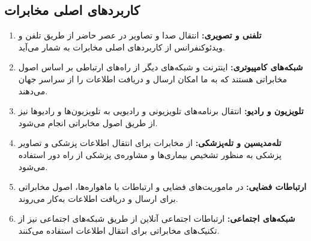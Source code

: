 \subsection{کاربردهای اصلی مخابرات}
\begin{enumerate}
	\item \textbf{تلفنی و تصویری:} انتقال صدا و تصاویر در عصر حاضر از طریق تلفن و ویدئوکنفرانس از کاربردهای اصلی مخابرات به شمار می‌آید.
	
	\item \textbf{شبکه‌های کامپیوتری:} اینترنت و شبکه‌های دیگر از راه‌های ارتباطی بر اساس اصول مخابراتی هستند که به ما امکان ارسال و دریافت اطلاعات را از سراسر جهان می‌دهند.
	
	\item \textbf{تلویزیون و رادیو:} انتقال برنامه‌های تلویزیونی و رادیویی به تلویزیون‌ها و رادیوها نیز از طریق اصول مخابراتی انجام می‌شود.
	
	\item \textbf{تله‌مدیسین و تله‌پزشکی:} از مخابرات برای انتقال اطلاعات پزشکی و تصاویر پزشکی به منظور تشخیص بیماری‌ها و مشاوره‌ی پزشکی از راه دور استفاده می‌شود.
	
	\item \textbf{ارتباطات فضایی:} در ماموریت‌های فضایی و ارتباطات با ماهواره‌ها، اصول مخابراتی برای ارسال و دریافت اطلاعات به‌کار می‌روند.
	
	\item \textbf{شبکه‌های اجتماعی:} ارتباطات اجتماعی آنلاین از طریق شبکه‌های اجتماعی نیز از تکنیک‌های مخابراتی برای انتقال اطلاعات استفاده می‌کنند.
\end{enumerate}

